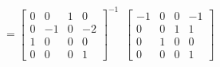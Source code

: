 \documentclass[preview]{standalone}
\begin{document}
\begin{center}
$ = \begin{bmatrix}0 & 0 & 1 & 0 \\ 0 & -1 & 0 & -2 \\ 1 & 0 & 0 & 0\\ 0 & 0 & 0 & 1\end{bmatrix}^{-1}$\
            $\begin{bmatrix}-1 & 0 & 0 & -1 \\ 0 & 0 & 1 & 1 \\ 0 & 1 & 0 & 0\\ 0 & 0 & 0 & 1\end{bmatrix}$
\end{center}
\end{document}
